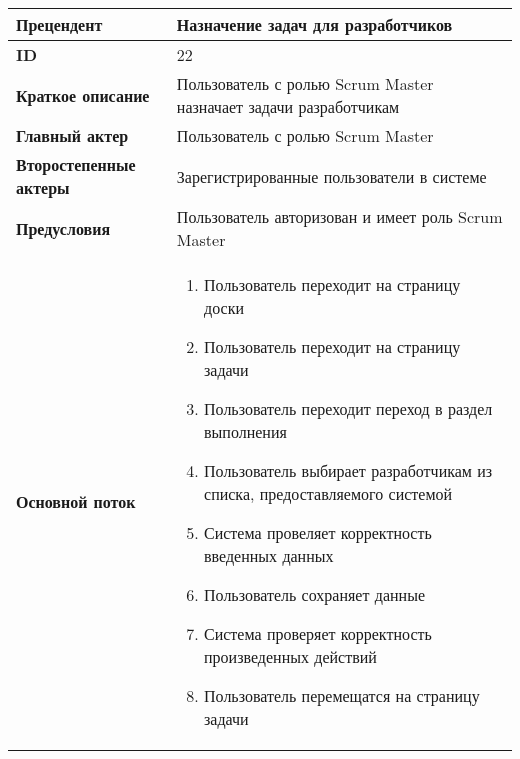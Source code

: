 \documentclass[14pt,a4paper]{extarticle}
\begin{document}
\begin{tabular}{|l|p{9cm}|}
	\hline
	\textbf{Прецендент}            & Назначение задач для разработчиков                                             \\
	\hline
	\textbf{ID}                    & 22                                                                           	\\
	\hline
	\textbf{Краткое описание}      & Пользователь с ролью Scrum Master назначает задачи разработчикам               \\
	\hline
	\textbf{Главный актер}         & Пользователь с ролью Scrum Master                                              \\
	\hline
	\textbf{Второстепенные актеры} & Зарегистрированные пользователи в системе                                   	\\
	\hline
	\textbf{Предусловия}           & Пользователь авторизован и имеет роль Scrum Master                       	\\
	\hline
	\textbf{Основной поток}        & \begin{enumerate}
		                                 \item Пользователь переходит на страницу доски
		                                 \item Пользователь переходит на страницу задачи
						 \item Пользователь переходит переход в раздел выполнения
						 \item Пользователь выбирает разработчикам из списка, предоставляемого системой
						 \item Система провеляет корректность введенных данных
					         \item Пользователь сохраняет данные
		                                 \item Система проверяет корректность произведенных действий
						 \item Пользователь перемещатся на страницу задачи
	                                 \end{enumerate} \\
	\hline
\end{tabular}


\printnoidxglossaries
\end{document}

